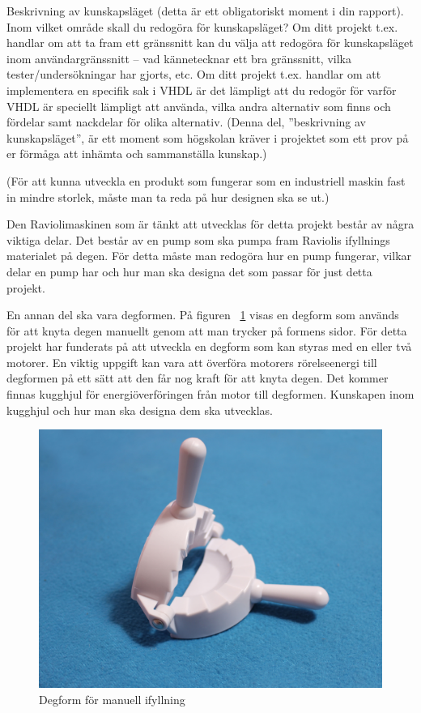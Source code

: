 Beskrivning av kunskapsläget (detta är ett obligatoriskt moment i din rapport). Inom vilket område skall du redogöra för kunskapsläget? Om ditt projekt t.ex. handlar om att ta fram ett gränssnitt kan du välja att redogöra för kunskapsläget inom användargränssnitt – vad kännetecknar ett bra gränssnitt, vilka tester/undersökningar har gjorts, etc. Om ditt projekt t.ex. handlar om att implementera en specifik sak i VHDL är det lämpligt att du redogör för varför VHDL är speciellt lämpligt att använda, vilka andra alternativ som finns och fördelar samt nackdelar för olika alternativ. (Denna del, ”beskrivning av kunskapsläget”, är ett moment som högskolan kräver i projektet som ett prov på er förmåga att inhämta och sammanställa kunskap.)\medskip

(För att kunna utveckla en produkt som fungerar som en industriell maskin fast in mindre storlek, måste man ta reda på hur designen ska se ut.)
 
Den Raviolimaskinen som är tänkt att utvecklas för detta projekt består av några viktiga delar. Det består av en pump som ska pumpa fram Raviolis ifyllnings materialet på degen. För detta måste man redogöra hur en pump fungerar, vilkar delar en pump har och hur man ska designa det som passar för just detta projekt.\medskip

En annan del ska vara degformen. På figuren ~\ref{degfrom} visas en degform som används för att knyta degen manuellt genom att man trycker på formens sidor. För detta projekt har funderats på att utveckla en degform som kan styras med en eller två motorer. En viktig uppgift kan vara att överföra motorers rörelseenergi till degformen på ett sätt att den får nog kraft för att knyta degen. Det kommer finnas kugghjul för energiöverföringen från motor till degformen. Kunskapen inom kugghjul och hur man ska designa dem ska utvecklas.\medskip

\begin{figure}[h]
	\begin{center}
		\includegraphics[scale=0.08] {images/degform.jpg}
		\caption{Degform för manuell ifyllning}
		\label{degfrom}	
	\end{center}
\end{figure}\medskip

